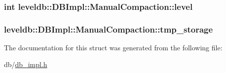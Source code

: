 \subsubsection[{level}]{\setlength{\rightskip}{0pt plus 5cm}int leveldb\+::\+D\+B\+Impl\+::\+Manual\+Compaction\+::level}\label{structleveldb_1_1_d_b_impl_1_1_manual_compaction_a0dd5f180af0b1019f04532bfdb317141}
\hypertarget{structleveldb_1_1_d_b_impl_1_1_manual_compaction_acfd5de0d18f7df7d222f1c09e500c9bc}{}
\subsubsection[{tmp\+\_\+storage}]{ leveldb\+::\+D\+B\+Impl\+::\+Manual\+Compaction\+::tmp\+\_\+storage}\label{structleveldb_1_1_d_b_impl_1_1_manual_compaction_acfd5de0d18f7df7d222f1c09e500c9bc}


The documentation for this struct was generated from the following file\+:\begin{DoxyCompactItemize}
\item 
db/\hyperlink{db__impl_8h}{db\+\_\+impl.\+h}\end{DoxyCompactItemize}
